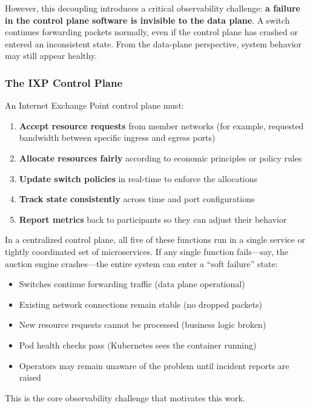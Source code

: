 However, this decoupling introduces a critical observability challenge: \textbf{a failure in the control plane software is invisible to the data plane}. A switch continues forwarding packets normally, even if the control plane has crashed or entered an inconsistent state. From the data-plane perspective, system behavior may still appear healthy.

\subsubsection{The IXP Control Plane}

An Internet Exchange Point control plane must:

\begin{enumerate}
    \item \textbf{Accept resource requests} from member networks (for example, requested bandwidth between specific ingress and egress ports)
    \item \textbf{Allocate resources fairly} according to economic principles or policy rules
    \item \textbf{Update switch policies} in real-time to enforce the allocations
    \item \textbf{Track state consistently} across time and port configurations
    \item \textbf{Report metrics} back to participants so they can adjust their behavior
\end{enumerate}

In a centralized control plane, all five of these functions run in a single service or tightly coordinated set of microservices. If any single function fails---say, the auction engine crashes---the entire system can enter a ``soft failure'' state:

\begin{itemize}
    \item Switches continue forwarding traffic (data plane operational)
    \item Existing network connections remain stable (no dropped packets)
    \item New resource requests cannot be processed (business logic broken)
    \item Pod health checks pass (Kubernetes sees the container running)
    \item Operators may remain unaware of the problem until incident reports are raised
\end{itemize}

This is the core observability challenge that motivates this work.

